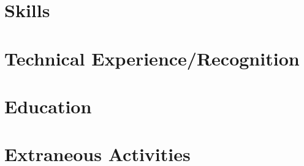 \documentclass[letter,10pt]{article}
\begin{document}
%

\section{Skills}


\section{Technical Experience/Recognition}


\section{Education}



\section{Extraneous Activities}

\end{document}
